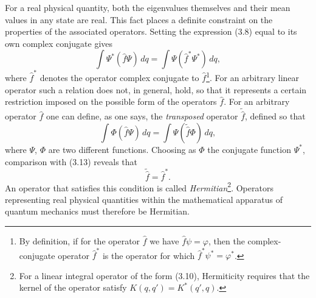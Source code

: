 For a real physical quantity, both the eigenvalues themselves and their mean
values in any state are real. This fact places a definite constraint on the
properties of the associated operators. Setting the expression (3.8) equal to
its own complex conjugate gives
\begin{equation}
  \int \Psi^*(\hat f\Psi)\,dq
  = \int \Psi(\hat f^*\Psi^*)\,dq,
  \tag{3.13}
\end{equation}
where $\hat f^*$ denotes the operator complex conjugate to
$\hat f$\footnote{By definition, if for the operator $\hat f$ we have
$\hat f\psi=\varphi$, then the complex-conjugate operator $\hat f^*$ is the
operator for which $\hat f^*\psi^*=\varphi^*$.}. For an arbitrary linear
operator such a relation does not, in general, hold, so that it represents a
certain restriction imposed on the possible form of the operators $\hat f$. For
an arbitrary operator $\hat f$ one can define, as one says, the
\emph{transposed} operator $\tilde{\hat f}$, defined%
so that
\begin{equation}
  \int \Phi(\hat f\Psi)\,dq
  = \int \Psi(\tilde{\hat f}\Phi)\,dq,
  \tag{3.14}
\end{equation}
where $\Psi$, $\Phi$ are two different functions. Choosing as
$\Phi$ the conjugate function $\Psi^*$, comparison with (3.13)
reveals that
\begin{equation}
  \tilde{\hat f}=\hat f^*.
  \tag{3.15}
\end{equation}
An operator that satisfies this condition is called \emph{Hermitian}\footnote{For a
linear integral operator of the form (3.10), Hermiticity requires
that the kernel of the operator satisfy
$K(q,q')=K^*(q',q)$.}. Operators representing real physical quantities within
the mathematical apparatus of quantum mechanics must therefore be Hermitian.


